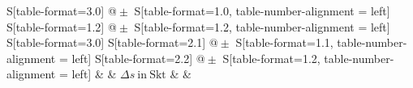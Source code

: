\begin{table}[h!]
    \centering
    \caption{Rubidium ($n=5,z=37$) -- Abschirmungszahl für das betrachtete Dublett, sowie bei der Berechnung verwendete Größen}
    \label{tab:Rubidium}
    \begin{tabular}{
	S[table-format=3.0]
	@{${}\pm{}$}
	S[table-format=1.0, table-number-alignment = left]
	S[table-format=1.2]
	@{${}\pm{}$}
	S[table-format=1.2, table-number-alignment = left]
	S[table-format=3.0]
	S[table-format=2.1]
	@{${}\pm{}$}
	S[table-format=1.1, table-number-alignment = left]
	S[table-format=2.2]
	@{${}\pm{}$}
	S[table-format=1.2, table-number-alignment = left]
	}
	\toprule
			& 		& 
	{$\Delta s \ \mathrm{in} \ \mathrm{Skt}$}		& 		& 
			\\ 
	\midrule
    
    \bottomrule
    \end{tabular}
    \end{table}
